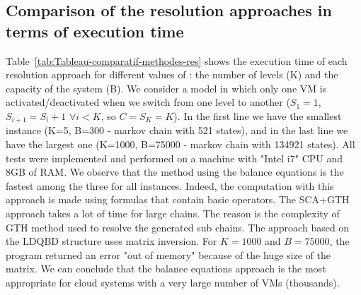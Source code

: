\documentclass[conference]{IEEEtran}
\begin{document}
\subsection{Comparison of the resolution approaches in terms of execution time}
\label{AAA}
Table~\ref{tab:Tableau-comparatif-methodes-res} shows the execution time of each resolution approach for different values of : the number of levels (K) and the capacity of the system (B). We consider a model in which only one VM is activated/deactivated when we switch from one level to another ($S_1=1$, $S_{i+1}=S_{i}+1$ $\forall i<K$, so $C=S_{K}=K$). In the first line we have the smallest instance (K=5, B=300 - markov chain with 521 states), and in the last line we have the largest one (K=1000, B=75000 - markov chain with 134921 states). All tests were implemented and performed on a machine with "Intel i7" CPU and 8GB of RAM. We observe that the method using the balance equations is the fastest among the three for all instances. Indeed, the computation with this approach is made using formulas that contain basic operators. The SCA+GTH approach takes a lot of time for large chains. The reason is the complexity of GTH method used to resolve the generated sub chains. The approach based on the LDQBD structure uses matrix inversion. For $K = 1000$ and $B = 75000$, the program returned an error "out of memory" because of the huge size of the matrix. We can conclude that the balance equations approach is the most appropriate for cloud systems with a very large number of VMs (thousands).
\end{document}
